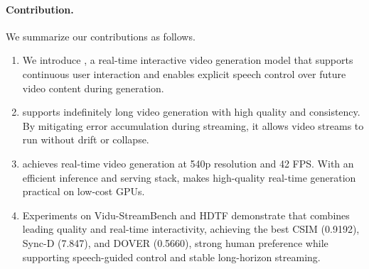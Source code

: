 \vspace{-3pt}
\paragraph{Contribution.}
We summarize our contributions as follows.

\begin{enumerate}
\item We introduce \ours, a real-time interactive video generation model that supports continuous user interaction and enables explicit speech control over future video content during generation.

\item \ours supports indefinitely long video generation with high quality and consistency. By mitigating error accumulation during streaming, it allows video streams to run without drift or collapse.

\item \ours achieves real-time video generation at 540p resolution and 42 FPS. With an efficient inference and serving stack, \ours makes high-quality real-time generation practical on low-cost GPUs.

\item Experiments on Vidu-StreamBench and HDTF demonstrate that \ours combines leading quality and real-time interactivity, achieving the best CSIM (0.9192), Sync-D (7.847), and DOVER (0.5660), strong human preference while supporting speech-guided control and stable long-horizon streaming.

\end{enumerate}


